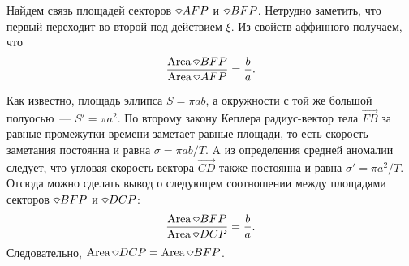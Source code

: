 Найдем связь площадей секторов $\sector AFP$ и $\sector BFP$. Нетрудно заметить, что первый переходит во второй под действием $\xi$. Из свойств аффинного получаем, что
\begin{equation*}
	\frac{\area \sector BFP}{\area \sector AFP} = \frac{b}{a}.
\end{equation*}


Как известно, площадь эллипса $S = \pi ab$, а окружности с той же большой полуосью~---  $S' = \pi a^2$. По второму закону Кеплера радиус-вектор тела $\overrightarrow{FB}$ за равные промежутки времени заметает равные площади, то есть скорость заметания постоянна и равна $\sigma = \pi a b / T$. A из определения средней аномалии следует, что угловая скорость вектора $\overrightarrow{CD}$ также постоянна и равна $\sigma' = \pi a^2 / T$. Отсюда можно сделать вывод о следующем соотношении между площадями секторов $\sector BFP$ и $ \sector DCP$:
\begin{equation*}
	\frac{\area \sector BFP}{\area \sector DCP} = \frac{b}{a}.
\end{equation*}
Следовательно, $\area \sector DCP = \area \sector BFP$.


